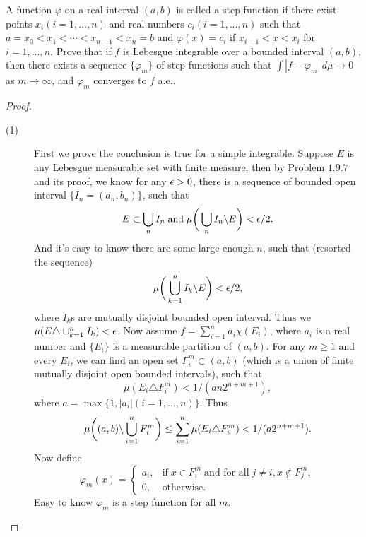 \begin{pro}%
	A function $\varphi$ on a real interval $(a,b)$ is called a step function if there exist points $x_i(i=1,\ldots,n)$ and real numbers $c_i(i=1,\ldots,n)$ such that $a=x_0<x_1<\cdots<x_{n-1}<x_n=b$ and $\varphi(x)=c_i$ if $x_{i-1}<x<x_i$ for $i=1,\ldots,n$. Prove that if $f$ is Lebesgue integrable over a bounded interval $(a,b)$, then there exists a sequence $\{\varphi_m\}$ of step functions such that $\int |f-\varphi_m|\,d\mu\to 0$ as $m\to\infty$, and $\varphi_m$ converges to $f$ a.e..
\end{pro}
\begin{proof}
\begin{description}
	\item[(1)] 
	First we prove the conclusion is true for a simple integrable. Suppose $E$ is any Lebesgue measurable set with finite measure, then by Problem $1.9.7$ and its proof, we know for any $\epsilon>0$, there is a sequence of bounded open interval $\{I_n=(a_n,b_n)\}$, such that
	\[E\subset \bigcup_n I_n\;\mbox{and}\; \mu\bigg(\bigcup_n I_n\backslash E\bigg)<\epsilon/2.\]
	And it's easy to know there are some large enough $n$, such that (resorted the sequence)
	\[\mu\bigg(\bigcup_{k=1}^n I_k \backslash E\bigg)<\epsilon/2,\]
	where $I_k$s are mutually disjoint bounded open interval. Thus we $\mu(E\triangle \cup_{k=1}^n I_k)<\epsilon$.
	Now assume $f=\sum_{i=1}^n a_i\chi(E_i)$, where $a_i$ is a real number and $\{E_i\}$ is a measurable partition of $(a,b)$. For any $m\geq 1$ and every $E_i$, we can find an open set $F_i^m\subset (a,b)$ (which is a union of finite mutually disjoint open bounded intervals), such that
	\[\mu(E_i \triangle F_i^m)<1/(an2^{n+m+1}),\] where $a=\max\{1,|a_i|(i=1,\ldots,n)\}$. Thus 
	\[\mu\bigg((a,b)\backslash\bigcup_{i=1}^n F_i^m\bigg)\leq \sum_{i=1}^n \mu(E_i\triangle F_i^m)<1/(a2^{n+m+1}).\]
	Now define
	\[\varphi_m(x)=\begin{cases}
	a_i,&\mbox{if}\;x\in F_i^m\;\mbox{and for all}\;j\neq i,x\notin F_j^m,\\
	0,&\mbox{otherwise}.\end{cases}\]
	Easy to know $\varphi_m$ is a step function for all $m$.



\end{description}
\end{proof}
